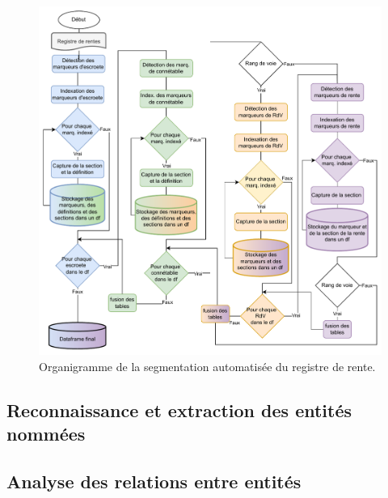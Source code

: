 \begin{figure}[ht] %
    \centering
    \includegraphics[scale=0.75]{2.Methods/Img/seg.drawio.pdf} 
    \caption{Organigramme de la segmentation automatisée du registre de rente.}
\end{figure}


\subsection{Reconnaissance et extraction des entités nommées}

\subsection{Analyse des relations entre entités}